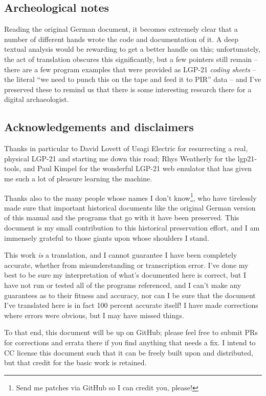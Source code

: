\subsection{Archeological notes}

Reading the original German document, it becomes extremely clear that a number of different hands wrote the code and documentation of it. A deep textual analysis would be rewarding to get a better handle on this; unfortunately, the act of translation obscures this significantly, but a few pointers still remain -- there are a few program examples that were provided as LGP-21 \emph{coding sheets} -- the literal ``we need to punch this on the tape and feed it to PIR'' data -- and I've preserved these to remind us that there is some interesting research there for a digital archaeologist.

\subsection{Acknowledgements and disclaimers}
Thanks in particular to David Lovett of Usagi Electric for resurrecting a real, physical LGP-21 and starting me down this road; Rhys Weatherly for the lgp21-tools, and Paul Kimpel for the wonderful LGP-21 web emulator that has given me such a lot of pleasure learning the machine.

Thanks also to the many people whose names I don't know\footnote{Send me patches via GitHub so I can credit you, please!}, who have tirelessly made sure that important historical documents like the original German version of this manual and the programs that go with it have been preserved. This document is my small contribution to this historical preservation effort, and I am immensely grateful to those giants upon whose shoulders I stand. 

This work \emph{is} a translation, and I cannot guarantee I have been completely accurate, whether from misunderstanding or transcription error. I've done my best to be sure my interpretation of what's documented here is correct, but I have not run or tested all of the programs referenced, and I can't make any guarantees as to their fitness and accuracy, nor can I be sure that the document I've translated here is in fact 100 percent accurate itself! I have made corrections where
errors were obvious, but I may have missed things.

To that end, this document will be up on GitHub; please feel free to submit PRs for corrections and errata there if you find anything that needs a fix. I intend to CC license this document such that it can be freely built upon and distributed, but that credit for the basic work is retained.


\newpage
